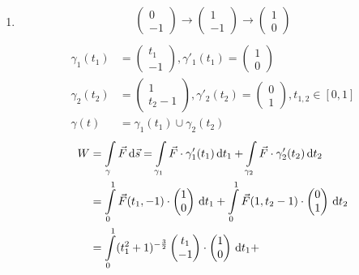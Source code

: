 \documentclass[fleqn,12pt]{scrartcl}
\newcommand{\id}{\, \mathrm{d}}
\newcommand{\intl}{\int\displaylimits}
\begin{document}
\begin{enumerate}
	\item
		\begin{align*}
		\begin{pmatrix}0\\-1 \end{pmatrix} \rightarrow
		\begin{pmatrix}1 \\ -1 \end{pmatrix} \rightarrow
		\begin{pmatrix}1 \\ 0 \end{pmatrix}\\
		\end{align*}
		\begin{align*}
		\gamma_1(t_1) &= \begin{pmatrix} t_1\\ -1\end{pmatrix}, \gamma'_1(t_1) = \begin{pmatrix} 1\\ 0 \end{pmatrix}\\
		\gamma_2(t_2) &= \begin{pmatrix} 1 \\ t_2-1 \end{pmatrix}, \gamma'_2(t_2) = \begin{pmatrix} 0 \\ 1 \end{pmatrix}, t_{1,2} \in [0, 1] \\
			\gamma(t) &= \gamma_1(t_1) \cup \gamma_2(t_2)
		\end{align*}
		\begin{align*}
			W &= \intl_\gamma \vec F \id \vec s = \intl_{\gamma_1} \vec F \cdot \gamma_1'(t_1) \id t_1 + \intl_{\gamma_2} \vec F \cdot \gamma_2'(t_2) \id t_2 \\
				 &= \intl_0^1 \vec F(t_1, -1) \cdot \begin{pmatrix} 1\\0\end{pmatrix} \id t_1 +
		\intl_0^1 \vec F(1, t_2-1) \cdot \begin{pmatrix}0\\1\end{pmatrix} \id t_2\\
		&= \intl_0^1 (t_1^2 + 1)^{-\frac32} \begin{pmatrix} t_1 \\ -1 \end{pmatrix} \cdot \begin{pmatrix}1\\0\end{pmatrix} \id t_1+

\end{align*}
\end{enumerate}
\end{document}
